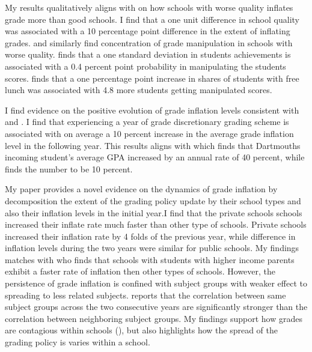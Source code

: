 

My results qualitatively aligns with \cite{jacob2003} on how schools with worse quality inflates grade more than good schools. I find that a one unit difference in school quality was associated with a 10 percentage point difference in the extent of inflating grades. \cite{jacob2003} and \cite{denning2023} similarly find concentration of grade manipulation in schools with worse quality. \cite{jacob2003} finds that a one standard deviation in students achievements is associated with a 0.4 percent point probability in manipulating the students scores. \cite{denning2023} finds that a one percentage point increase in shares of students with free lunch was associated with 4.8 more students getting manipulated scores. 

I find evidence on the positive evolution of grade inflation levels consistent with \cite{dee2019} and \cite{bleemer2020gradeinflation}. I find that experiencing a year of grade discretionary grading scheme is associated with on average a 10 percent increase in the average grade inflation level in the following year. This results aligns with\cite{dee2019} which finds that Dartmouths incoming student's average GPA increased by an annual rate of 40 percent, while \cite{bleemer2020gradeinflation} finds the number to be 10 percent. 

My paper provides a novel evidence on the dynamics of grade inflation by decomposition the extent of the grading policy update by their school types and also their inflation levels in the initial year.I find that the private schools schools increased their inflate rate much faster than other type of schools. Private schools increased their inflation rate by 4 folds of the previous year, while difference in inflation levels during the two years were similar for public schools. My findings matches with \cite{bleemer2020gradeinflation} who finds that schools with students with higher income parents exhibit a faster rate of inflation then other types of schools. However, the persistence of grade inflation is confined with subject groups with weaker effect to spreading to less related subjects.  reports that the correlation between same subject groups across the two consecutive years are significantly stronger than the correlation between neighboring subject groups. My findings support how grades are contagious within schools (\cite{https://doi.org/10.1111/j.1468-2354.2007.00454.x}), but also highlights how the spread of the grading policy is varies within a school. 

